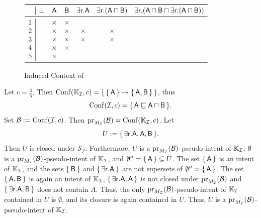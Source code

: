 \begin{Example}
  \begin{figure}[tp]
    \centering
    \begin{math}
      \begin{array}{c|*{6}{c}}
        \toprule
        ~ & \bot & \mathsf{A} & \mathsf{B} & \mathsf{\exists r. A} & \mathsf{\exists r. (A
          \sqcap B)} & \mathsf{\exists r. (A \sqcap B \sqcap \exists r. (A \sqcap B))} \\
        \midrule
        1 & & \times & \times \\
        2 & & \times & \times & \times & \times \\
        3 & & \times & \times & \times & \times \\
        4 & & \times & \times \\
        5 & & \times  \\
        \bottomrule
      \end{array}
    \end{math}
    \caption{Induced Context of }
    \label{fig:no-minimality-induced-context}
  \end{figure}

  Let $c = \frac 4 5$.  Then $\operatorname{Conf}({\mathbb{K}}_{\mathcal{I}}, c) = {\{\, {\{\, \mathsf{A} \,\}}
    \to {\ensuremath{\{\, \mathsf{A}, \mathsf{B} \,\}}} \,\}}$, thus
  \begin{equation*}
    \operatorname{Conf}(\mathcal{I}, c) = {\{\, \mathsf{A} \sqsubseteq \mathsf{A \sqcap B} \,\}}.
  \end{equation*}
  Set $\mathcal{B} := \operatorname{Conf}(\mathcal{I}, c)$.  Then $\operatorname{pr}_{M_{\mathcal{I}}}(\mathcal{B}) =
  \operatorname{Conf}({\mathbb{K}}_{\mathcal{I}}, c)$.  Let
  \begin{equation*}
    U := {\{\, \mathsf{\exists r. A}, \mathsf{A}, \mathsf{B} \,\}}.
  \end{equation*}
  Then $U$ is closed under $\mathcal{S}_{\mathcal{I}}$.  Furthermore, $U$ is a
  $\operatorname{pr}_{M_{\mathcal{I}}}(\mathcal{B})$-pseudo-intent of ${\mathbb{K}}_{\mathcal{I}}$:
  $\emptyset$ is a $\operatorname{pr}_{M_{\mathcal{I}}}(\mathcal{B})$-pseudo-intent of ${\mathbb{K}}_{\mathcal{I}}$, and $\emptyset'' = {\{\, \mathsf{A} \,\}} \subseteq U$.  The set ${\{\,
    \mathsf{A} \,\}}$ is an intent of ${\mathbb{K}}_{\mathcal{I}}$, and the sets ${\{\, \mathsf{B}
  \,\}}$ and ${\{\, \mathsf{\exists r. A} \,\}}$ are not supersets of $\emptyset'' = {\{\,
    \mathsf{A} \,\}}$.  The set ${\{\, \mathsf{A}, \mathsf{B} \,\}}$ is again an intent of ${\mathbb{K}}_{\mathcal{I}}$, ${\{\, \mathsf{\exists r. A}, \mathsf{A} \,\}}$ is not closed under
  $\operatorname{pr}_{M_{\mathcal{I}}}(\mathcal{B})$ and ${\{\, \mathsf{\exists r. A}, \mathsf{B} \,\}}$
  does not contain $A$.  Thus, the only $\operatorname{pr}_{M_{\mathcal{I}}}(\mathcal{B})$-pseudo-intent
  of ${\mathbb{K}}_{\mathcal{I}}$ contained in $U$ is $\emptyset$, and its closure is again
  contained in $U$.  Thus, $U$ is a $\operatorname{pr}_{M_{\mathcal{I}}}(\mathcal{B})$-pseudo-intent of
  ${\mathbb{K}}_{\mathcal{I}}$.


\end{Example}
